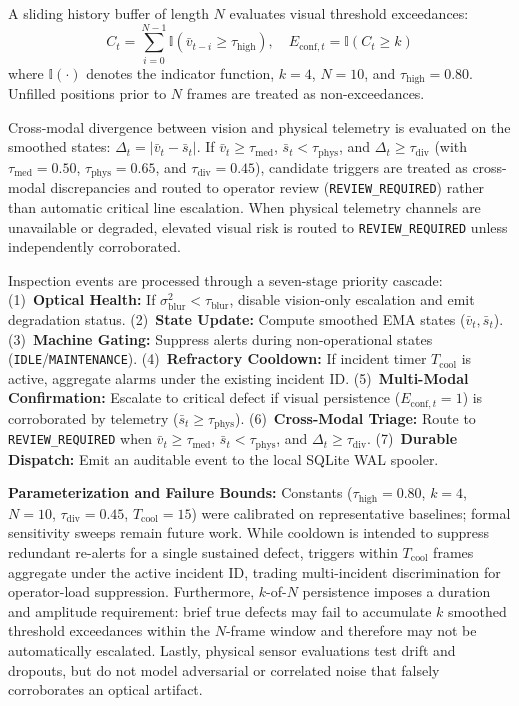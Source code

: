\documentclass[conference]{IEEEtran}
\begin{document}
A sliding history buffer of length $N$ evaluates visual threshold exceedances:
\begin{equation}
C_t = \sum_{i=0}^{N-1} \mathbb{I}(\bar{v}_{t-i} \ge \tau_{\mathrm{high}}), \quad E_{\mathrm{conf}, t} = \mathbb{I}(C_t \ge k)
\end{equation}
where $\mathbb{I}(\cdot)$ denotes the indicator function, $k = 4$, $N = 10$, and $\tau_{\mathrm{high}} = 0.80$. Unfilled positions prior to $N$ frames are treated as non-exceedances.

Cross-modal divergence between vision and physical telemetry is evaluated on the smoothed states: $\Delta_t = |\bar{v}_t - \bar{s}_t|$. If $\bar{v}_t \ge \tau_{\mathrm{med}}$, $\bar{s}_t < \tau_{\mathrm{phys}}$, and $\Delta_t \ge \tau_{\mathrm{div}}$ (with $\tau_{\mathrm{med}} = 0.50$, $\tau_{\mathrm{phys}} = 0.65$, and $\tau_{\mathrm{div}} = 0.45$), candidate triggers are treated as cross-modal discrepancies and routed to operator review (\texttt{REVIEW\_REQUIRED}) rather than automatic critical line escalation. When physical telemetry channels are unavailable or degraded, elevated visual risk is routed to \texttt{REVIEW\_REQUIRED} unless independently corroborated.

Inspection events are processed through a seven-stage priority cascade:
(1)~\textbf{Optical Health:} If $\sigma_{\mathrm{blur}}^2 < \tau_{\mathrm{blur}}$, disable vision-only escalation and emit degradation status.
(2)~\textbf{State Update:} Compute smoothed EMA states ($\bar{v}_t, \bar{s}_t$).
(3)~\textbf{Machine Gating:} Suppress alerts during non-operational states (\texttt{IDLE}/\texttt{MAINTENANCE}).
(4)~\textbf{Refractory Cooldown:} If incident timer $T_{\mathrm{cool}}$ is active, aggregate alarms under the existing incident ID.
(5)~\textbf{Multi-Modal Confirmation:} Escalate to critical defect if visual persistence ($E_{\mathrm{conf}, t} = 1$) is corroborated by telemetry ($\bar{s}_t \ge \tau_{\mathrm{phys}}$).
(6)~\textbf{Cross-Modal Triage:} Route to \texttt{REVIEW\_REQUIRED} when $\bar{v}_t \ge \tau_{\mathrm{med}}$, $\bar{s}_t < \tau_{\mathrm{phys}}$, and $\Delta_t \ge \tau_{\mathrm{div}}$.
(7)~\textbf{Durable Dispatch:} Emit an auditable event to the local SQLite WAL spooler.

\noindent\textbf{Parameterization and Failure Bounds:} Constants ($\tau_{\mathrm{high}} = 0.80$, $k = 4$, $N = 10$, $\tau_{\mathrm{div}} = 0.45$, $T_{\mathrm{cool}} = 15$) were calibrated on representative baselines; formal sensitivity sweeps remain future work. While cooldown is intended to suppress redundant re-alerts for a single sustained defect, triggers within $T_{\mathrm{cool}}$ frames aggregate under the active incident ID, trading multi-incident discrimination for operator-load suppression. Furthermore, $k$-of-$N$ persistence imposes a duration and amplitude requirement: brief true defects may fail to accumulate $k$ smoothed threshold exceedances within the $N$-frame window and therefore may not be automatically escalated. Lastly, physical sensor evaluations test drift and dropouts, but do not model adversarial or correlated noise that falsely corroborates an optical artifact.
\end{document}
